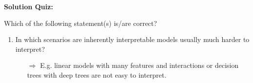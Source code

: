 \textbf{Solution Quiz:}\\\noindent
\medskip

Which of the following statement(s) is/are correct?  
	\begin{enumerate}
        \item In which scenarios are inherently interpretable models usually much harder to interpret?
    	\begin{itemize}
    		\item[$\Rightarrow$] E.g. linear models with many features and interactions or decision trees with deep trees are not easy to interpret.
    	\end{itemize}
	\end{enumerate}